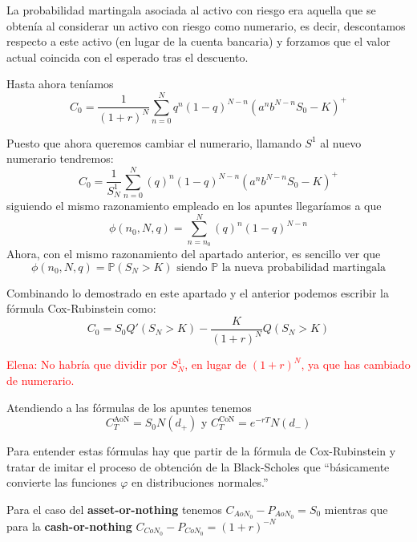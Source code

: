 \begin{problem}[1]
\spart

La probabilidad martingala asociada al activo con riesgo era aquella que se obtenía al considerar un activo con riesgo como numerario, es decir, descontamos respecto a este activo (en lugar de la cuenta bancaria) y forzamos que el valor actual coincida con el esperado tras el descuento.

Hasta ahora teníamos
\[C_0 = \frac{1}{(1+r)^N}\sum_{n=0}^Nq^n(1-q)^{N-n}(a^nb^{N-n}S_0-K)^+\]

Puesto que ahora queremos cambiar el numerario, llamando $S^1$ al nuevo numerario tendremos:
\[C_0 = \frac{1}{S^1_N}\sum_{n=0}^N(q)^n(1-q)^{N-n}(a^nb^{N-n}S_0-K)^+\]
siguiendo el mismo razonamiento empleado en los apuntes llegaríamos a que
\[\phi(n_0,N,q) = \sum_{n=n_0}^N(q)^n(1-q)^{N-n}\]
Ahora, con el mismo razonamiento del apartado anterior, es sencillo ver que
\[\phi(n_0,N,q) = \mathbb{P}(S_N>K) \text{ siendo } \mathbb{P} \text{ la nueva probabilidad martingala}\]

Combinando lo demostrado en este apartado y el anterior podemos escribir la fórmula Cox-Rubinstein como:
\[C_0=S_0Q'(S_N>K) - \frac{K}{(1+r)^N}Q(S_N>K)\]

\textcolor{red}{Elena: No habría que dividir por $S^{1}_{N}$, en lugar de $(1+r)^N$, ya que has cambiado de numerario.}\\
\spart

Atendiendo a las fórmulas de los apuntes tenemos
\[C_T^{\text{AoN}}=S_0N(d_+) \text{ y } C_T^{\text{CoN}}=e^{-rT}N(d_-)\]

Para entender estas fórmulas hay que partir de la fórmula de Cox-Rubinstein y tratar de imitar el proceso de obtención de la Black-Scholes que ``básicamente convierte las funciones $\varphi$ en distribuciones normales.''

\spart

Para el caso del \textbf{asset-or-nothing} tenemos $C_{AoN_0}-P_{AoN_0} = S_0$ mientras que para la \textbf{cash-or-nothing} $C_{CoN_0}-P_{CoN_0}=(1+r)^{-N}$

\end{problem}

